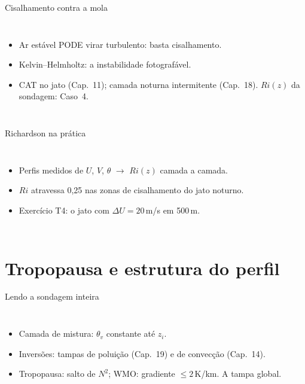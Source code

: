\documentclass[aspectratio=169,11pt]{beamer}
\begin{document}
\begin{frame}{Cisalhamento contra a mola}
  \begin{columns}
    \vspace{0.4em}
    \begin{itemize}
      \item Ar estável PODE virar turbulento: basta cisalhamento.
      \item Kelvin--Helmholtz: a instabilidade fotografável.
      \item CAT no jato (Cap.~11); camada noturna intermitente
            (Cap.~18). $Ri(z)$ da sondagem: Caso~4.
    \end{itemize}
  \end{columns}
\end{frame}

\begin{frame}{Richardson na prática}
  \begin{columns}
    \begin{itemize}
      \item Perfis medidos de $U$, $V$, $\theta$ $\to$ $Ri(z)$ camada a
            camada.
      \item $Ri$ atravessa 0{,}25 nas zonas de cisalhamento do jato
            noturno.
      \item Exercício T4: o jato com $\Delta U = 20$\,m/s em 500\,m.
    \end{itemize}
  \end{columns}
\end{frame}

\section{Tropopausa e estrutura do perfil}

\begin{frame}{Lendo a sondagem inteira}
  \begin{columns}
    \begin{itemize}
      \item \alert{Camada de mistura}: $\theta_v$ constante até $z_i$.
      \item \alert{Inversões}: tampas de poluição (Cap.~19) e de
            convecção (Cap.~14).
      \item \alert{Tropopausa}: salto de $N^2$; WMO: gradiente
            $\le2$\,K/km. A tampa global.
    \end{itemize}
  \end{columns}
\end{frame}
\end{document}
